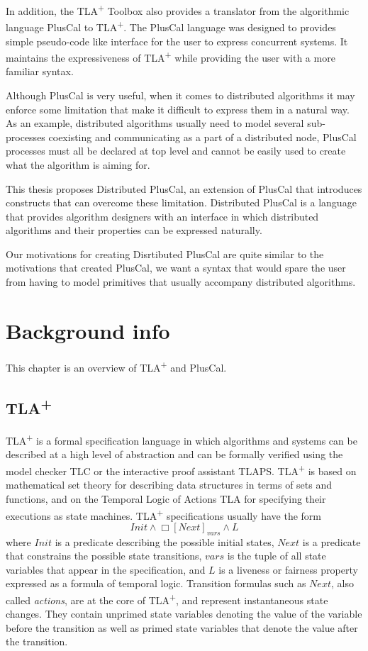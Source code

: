\documentclass{thesul}
\newcommand{\tlaplus}{TLA\textsuperscript{+}\xspace}
\begin{document}
In addition, the \tlaplus Toolbox also provides a translator from the algorithmic language PlusCal to \tlaplus. The PlusCal language was designed to provides simple pseudo-code like interface for the user to express concurrent systems. It maintains the expressiveness of \tlaplus while providing the user with a more familiar syntax.

Although PlusCal is very useful, when it comes to distributed algorithms it may enforce some limitation that make it difficult to express them in a natural way. As an example, distributed algorithms usually need to model several sub-processes coexisting and communicating as a part of a distributed node, PlusCal processes must all be declared at top level and cannot be easily used to create what the algorithm is aiming for. 

This thesis proposes Distributed PlusCal, an extension of PlusCal that introduces constructs that can overcome these limitation. Distributed PlusCal is a language that provides algorithm designers with an interface in which distributed algorithms and their properties can be expressed naturally.

Our motivations for creating Disrtibuted PlusCal are quite similar to the motivations that created PlusCal, we want a syntax that would spare the user from having to model primitives that usually accompany distributed algorithms.


\chapter{Background info}

This chapter is an overview of \tlaplus and PlusCal.
\section{\tlaplus}

\tlaplus is a formal specification language in which algorithms and systems can be described at a high level of abstraction and can be formally verified using the model checker TLC or the interactive proof assistant TLAPS. \tlaplus is based on mathematical set theory for describing data structures in terms of sets and functions, and on the Temporal Logic of Actions TLA for specifying their executions as state machines. \tlaplus specifications usually have the form
\[
  Init \land \Box[Next]_{vars} \land L
\]
where $Init$ is a predicate describing the possible initial states, $Next$ is a predicate that constrains the possible state transitions, $vars$ is the tuple of all state variables that appear in the specification, and $L$ is a liveness or fairness property expressed as a formula of temporal logic. Transition formulas such as $Next$, also called \emph{actions}, are at the core of \tlaplus, and represent instantaneous state changes. They contain unprimed state variables denoting the value of the variable before the transition as well as primed state variables that denote the value after the transition.
\end{document}
